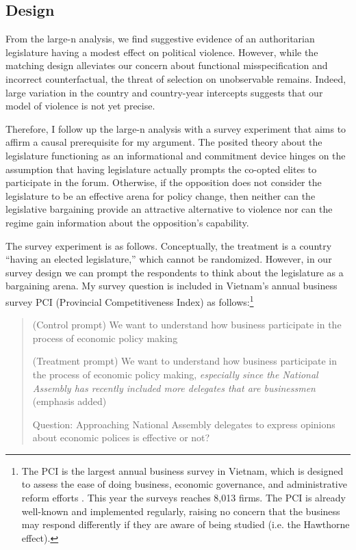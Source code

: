 \subsection{Design}

From the large-n analysis, we find suggestive evidence of an authoritarian legislature having a modest effect on political violence. However, while the matching design alleviates our concern about functional misspecification and incorrect counterfactual, the threat of selection on unobservable remains. Indeed, large variation in the country and country-year intercepts suggests that our model of violence is not yet precise.

Therefore, I follow up the large-n analysis with a survey experiment that aims to affirm a causal prerequisite for my argument. The posited theory about the legislature functioning as an informational and commitment device hinges on the assumption that having legislature actually prompts the co-opted elites to participate in the forum. Otherwise, if the opposition does not consider the legislature to be an effective arena for policy change, then neither can the legislative bargaining provide an attractive alternative to violence nor can the regime gain information about the opposition's capability.

The survey experiment is as follows. Conceptually, the treatment is a country ``having an elected legislature,'' which cannot be randomized. However, in our survey design we can prompt the respondents to think about the legislature as a bargaining arena. My survey question is included in Vietnam's annual business survey PCI (Provincial Competitiveness Index) as follows:\footnote{The PCI is the largest annual business survey in Vietnam, which is designed to assess the ease of doing business, economic governance, and administrative reform efforts \citep{Malesky2013}. This year the surveys reaches 8,013 firms. The PCI is already well-known and implemented regularly, raising no concern that the business may respond differently if they are aware of being studied (i.e. the Hawthorne effect).}

\begin{quote}
(Control prompt) We want to understand how business participate in the process of economic policy making

(Treatment prompt) We want to understand how business participate in the process of economic policy making, \textit{especially since the National Assembly has recently included more delegates that are businessmen} (emphasis added)

Question: Approaching National Assembly delegates to express opinions about economic polices is effective or not?
\end{quote}

